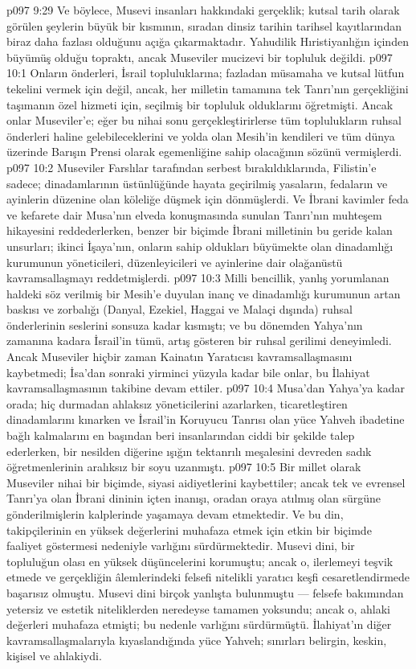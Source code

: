 \vs p097 9:29 Ve böylece, Musevi insanları hakkındaki gerçeklik; kutsal tarih olarak görülen şeylerin büyük bir kısmının, sıradan dinsiz tarihin tarihsel kayıtlarından biraz daha fazlası olduğunu açığa çıkarmaktadır. Yahudilik Hıristiyanlığın içinden büyümüş olduğu topraktı, ancak Museviler mucizevi bir topluluk değildi.
\vs p097 10:1 Onların önderleri, İsrail topluluklarına; fazladan müsamaha ve kutsal lütfun tekelini vermek için değil, ancak, her milletin tamamına tek Tanrı’nın gerçekliğini taşımanın özel hizmeti için, seçilmiş bir topluluk olduklarını öğretmişti. Ancak onlar Museviler’e; eğer bu nihai sonu gerçekleştirirlerse tüm toplulukların ruhsal önderleri haline gelebileceklerini ve yolda olan Mesih’in kendileri ve tüm dünya üzerinde Barışın Prensi olarak egemenliğine sahip olacağının sözünü vermişlerdi.
\vs p097 10:2 Museviler Farslılar tarafından serbest bırakıldıklarında, Filistin’e sadece; dinadamlarının üstünlüğünde hayata geçirilmiş yasaların, fedaların ve ayinlerin düzenine olan köleliğe düşmek için dönmüşlerdi. Ve İbrani kavimler feda ve kefarete dair Musa’nın elveda konuşmasında sunulan Tanrı’nın muhteşem hikayesini reddederlerken, benzer bir biçimde İbrani milletinin bu geride kalan unsurları; ikinci İşaya’nın, onların sahip oldukları büyümekte olan dinadamlığı kurumunun yöneticileri, düzenleyicileri ve ayinlerine dair olağanüstü kavramsallaşmayı reddetmişlerdi.
\vs p097 10:3 Milli bencillik, yanlış yorumlanan haldeki söz verilmiş bir Mesih’e duyulan inanç ve dinadamlığı kurumunun artan baskısı ve zorbalığı (Danyal, Ezekiel, Haggai ve Malaçi dışında) ruhsal önderlerinin seslerini sonsuza kadar kısmıştı; ve bu dönemden Yahya’nın zamanına kadara İsrail’in tümü, artış gösteren bir ruhsal gerilimi deneyimledi. Ancak Museviler hiçbir zaman Kainatın Yaratıcısı kavramsallaşmasını kaybetmedi; İsa’dan sonraki yirminci yüzyıla kadar bile onlar, bu İlahiyat kavramsallaşmasının takibine devam ettiler.
\vs p097 10:4 Musa’dan Yahya’ya kadar orada; hiç durmadan ahlaksız yöneticilerini azarlarken, ticaretleştiren dinadamlarını kınarken ve İsrail’in Koruyucu Tanrısı olan yüce Yahveh ibadetine bağlı kalmalarını en başından beri insanlarından ciddi bir şekilde talep ederlerken, bir nesilden diğerine ışığın tektanrılı meşalesini devreden sadık öğretmenlerinin aralıksız bir soyu uzanmıştı.
\vs p097 10:5 Bir millet olarak Museviler nihai bir biçimde, siyasi aidiyetlerini kaybettiler; ancak tek ve evrensel Tanrı’ya olan İbrani dininin içten inanışı, oradan oraya atılmış olan sürgüne gönderilmişlerin kalplerinde yaşamaya devam etmektedir. Ve bu din, takipçilerinin en yüksek değerlerini muhafaza etmek için etkin bir biçimde faaliyet göstermesi nedeniyle varlığını sürdürmektedir. Musevi dini, bir topluluğun olası en yüksek düşüncelerini korumuştu; ancak o, ilerlemeyi teşvik etmede ve gerçekliğin âlemlerindeki felsefi nitelikli yaratıcı keşfi cesaretlendirmede başarısız olmuştu. Musevi dini birçok yanlışta bulunmuştu --- felsefe bakımından yetersiz ve estetik niteliklerden neredeyse tamamen yoksundu; ancak o, ahlaki değerleri muhafaza etmişti; bu nedenle varlığını sürdürmüştü. İlahiyat’ın diğer kavramsallaşmalarıyla kıyaslandığında yüce Yahveh; sınırları belirgin, keskin, kişisel ve ahlakiydi.
